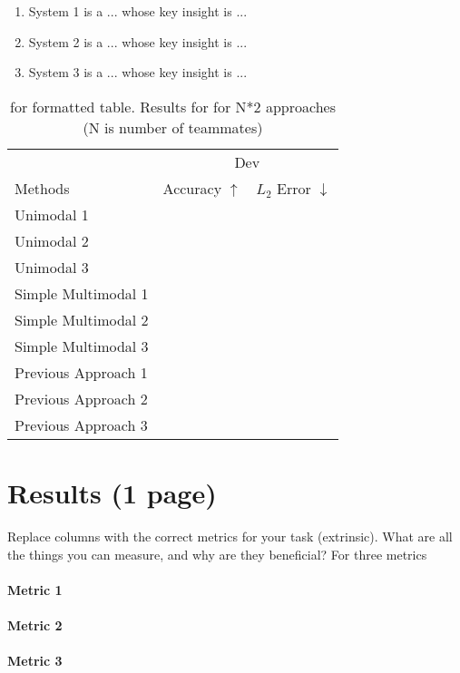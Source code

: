 \documentclass{article} %
\begin{document}
\begin{enumerate}
  \item System 1 is a ... whose key insight is ... 
  \item System 2 is a ... whose key insight is ... 
  \item System 3 is a ... whose key insight is ... 
\end{enumerate}

\clearpage
\begin{table}[t]
\centering
\begin{tabular}{@{}lrr@{}}
\toprule
                            & \multicolumn{2}{c}{Dev} \\
Methods                     & Accuracy $\uparrow$ & $L_2$ Error $\downarrow$  \\
\midrule
Unimodal 1 \cite{} & & \\
Unimodal 2 \cite{} & & \\
Unimodal 3 \cite{} & & \\
\midrule
Simple Multimodal 1 \cite{} & & \\
Simple Multimodal 2 \cite{} & & \\
Simple Multimodal 3 \cite{} & & \\
\midrule
Previous Approach 1 \cite{} & & \\
Previous Approach 2 \cite{} & & \\
Previous Approach 3 \cite{} & & \\
\bottomrule
\end{tabular}
\label{sec:results}
\caption{ for formatted table.  Results for for N*2 approaches (N is number of teammates)}
\end{table}
\section{Results (1 page)}
Replace columns with the correct metrics for your task (extrinsic). What are 
all the things you can measure, and why are they beneficial?
 For three metrics

\paragraph{Metric 1}

\paragraph{Metric 2}

\paragraph{Metric 3}
\end{document}
